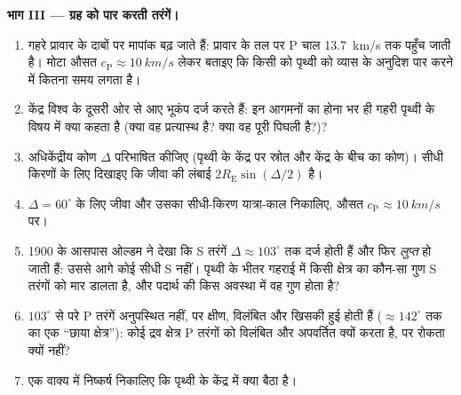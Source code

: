 \begin{problem}[{सप्ताहांत समस्या --- भूकंपों ने द्रव क्रोड कैसे
उजागर किया}]
\medskip\noindent\textbf{भाग III --- ग्रह को पार करती तरंगें।}
\begin{enumerate}[resume]
  \item गहरे प्रावार के दाबों पर मापांक बढ़ जाते हैं: प्रावार के तल पर
        P चाल \qty{13.7}{km/s} तक पहुँच जाती है। मोटा औसत
        $c_{\text{P}} \approx \qty{10}{km/s}$ लेकर बताइए कि किसी
         को पृथ्वी को व्यास के अनुदिश पार करने में कितना समय लगता है।
  \item केंद्र विश्व के दूसरी ओर से आए भूकंप दर्ज करते हैं: इन आगमनों
        का होना भर ही गहरी पृथ्वी के विषय में क्या कहता है (क्या वह
        प्रत्यास्थ है? क्या वह पूरी पिघली है?)?
  \item अधिकेंद्रीय कोण $\Delta$ परिभाषित कीजिए (पृथ्वी के केंद्र पर
        स्रोत और केंद्र के बीच का कोण)। सीधी किरणों के लिए दिखाइए
        कि जीवा की लंबाई $2R_{\text{E}}\sin(\Delta/2)$ है।
  \item $\Delta = 60^\circ$ के लिए जीवा और उसका सीधी-किरण यात्रा-काल
        निकालिए, औसत $c_{\text{P}} \approx
        \qty{10}{km/s}$ पर।
  \item 1900 के आसपास ओल्डम ने देखा कि S तरंगें
        $\Delta \approx 103^\circ$ तक दर्ज होती हैं और फिर
        \emph{लुप्त} हो जाती हैं: उससे आगे कोई सीधी S नहीं। पृथ्वी के
        भीतर गहराई में किसी क्षेत्र का कौन-सा गुण S तरंगों को मार
        डालता है, और पदार्थ की किस अवस्था में वह गुण होता है?
  \item $103^\circ$ से परे P तरंगें अनुपस्थित नहीं, पर क्षीण,
        विलंबित और खिसकी हुई होती हैं ($\approx 142^\circ$ तक का एक
        ``छाया क्षेत्र''): कोई द्रव क्षेत्र P तरंगों को विलंबित और
        अपवर्तित क्यों करता है, पर रोकता क्यों नहीं?
  \item एक वाक्य में निष्कर्ष निकालिए कि पृथ्वी के केंद्र में क्या
        बैठा है।
\end{enumerate}


\end{problem}
